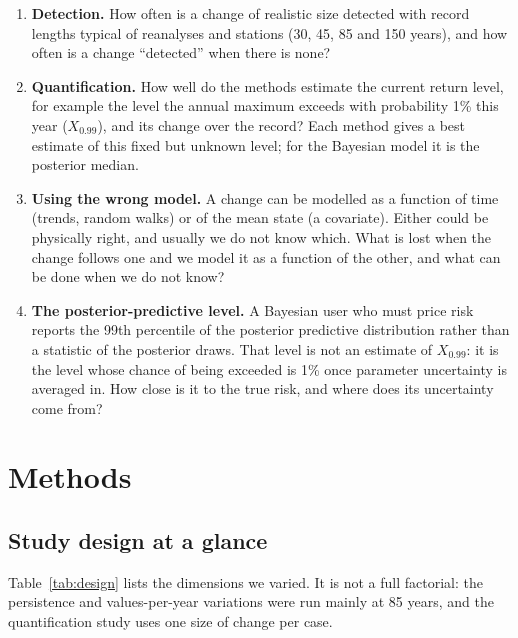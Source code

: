 \documentclass[11pt]{article}
\newcommand{\Xp}{X_{0.99}}
\begin{document}
\begin{enumerate}
\item \textbf{Detection.} How often is a change of realistic size detected with record lengths
  typical of reanalyses and stations (30, 45, 85 and 150 years), and how often is a change
  ``detected'' when there is none?
\item \textbf{Quantification.} How well do the methods estimate the current return level, for
  example the level the annual maximum exceeds with probability 1\% this year ($\Xp$), and its
  change over the record? Each method gives a best estimate of this fixed but unknown level; for
  the Bayesian model it is the posterior median.
\item \textbf{Using the wrong model.} A change can be modelled as a function of time (trends,
  random walks) or of the mean state (a covariate). Either could be physically right, and usually
  we do not know which. What is lost when the change follows one and we model it as a function of
  the other, and what can be done when we do not know?
\item \textbf{The posterior-predictive level.} A Bayesian user who must price risk reports the
  99th percentile of the posterior predictive distribution rather than a statistic of the
  posterior draws. That level is not an estimate of $\Xp$: it is the level whose chance of being
  exceeded is 1\% once parameter uncertainty is averaged in. How close is it to the true risk,
  and where does its uncertainty come from?
\end{enumerate}

\section{Methods}

\subsection{Study design at a glance}

Table~\ref{tab:design} lists the dimensions we varied. It is not a full factorial: the persistence
and values-per-year variations were run mainly at 85 years, and the quantification study uses one
size of change per case.
\end{document}
